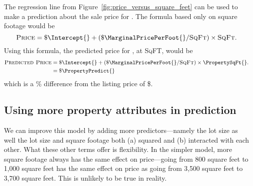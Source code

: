 \documentclass[
12pt, %
letterpaper, %
oneside, %
headinclude,footinclude, %
BCOR5mm, %
]{scrartcl}
\begin{document}
The regression line from Figure~\ref{fig:price_versus_square_feet} can be used to make a prediction about the sale price for \PropertyName{}. 
The formula based only on square footage would be
\begin{equation}
  \textsc{Price} = \$ \Intercept{} + (\$ \MarginalPricePerFoot{}/\textsc{SqFt}) \times \textsc{SqFt}. \nonumber
\end{equation}
Using this formula, the predicted price for \PropertyName{}, at \PropertySqFt{} \textsc{SqFT}, would be
\begin{align}
\textsc{Predicted Price} & = \$ \Intercept{} + (\$ \MarginalPricePerFoot{}/\textsc{SqFt}) \times \PropertySqFt{}. \\ \nonumber
                         & = \$ \PropertyPredict{} \nonumber 
\end{align}
which is a \PctDiff{}\% difference from the listing price of \$\PropertyPrice{}.



\subsection{Using more property attributes in prediction}
We can improve this model by adding more predictors---namely the lot size as well the lot size and square footage both (a) squared and (b) interacted with each other.
What these other terms offer is flexibility.
In the simpler model, more square footage always has the same effect on price---going from 800 square feet to 1,000 square feet has the same effect on price as going from 3,500 square feet to 3,700 square feet.
This is unlikely to be true in reality.
\end{document}
